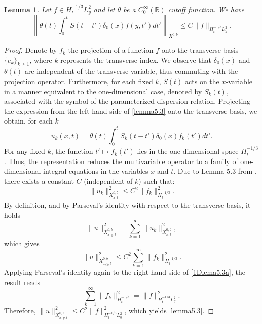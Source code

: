 \documentclass[11pt]{article}
\numberwithin{equation}{section}
\newtheorem{lemma}{Lemma}
\begin{document}
\begin{lemma}\label{lema5.3}
Let $f\in H^{-1/3}_{t}L^{2}_{y}$ and let $\theta$ be a $C_{0}^{\infty}(\mathbb{R})$ cutoff function. We have \begin{equation}\label{lemma5.3}
\left\|\theta(t)\int_{0}^{t} S(t-t')\delta_{0}(x)f(y,t')dt'\right\|_{X^{0,b}}\leq C\|f\|_{H^{-1/3}_{t}L^{2}_{y}}.\end{equation}
\end{lemma}
\begin{proof}
Denote by $f_{k}$ the projection of a function $f$ onto the transverse basis $\{e_{k}\}_{k \ge 1}$, where $k$ represents the transverse index. We observe that $\delta_{0}(x)$ and $\theta(t)$ are independent of the transverse variable, thus commuting with the projection operator. Furthermore, for each fixed $k$, $S(t)$ acts on the $x$-variable in a manner equivalent to the one-dimensional case, denoted by $S_{k}(t)$, associated with the symbol of the parameterized dispersion relation. Projecting the expression from the left-hand side of \eqref{lemma5.3} onto the transverse basis, we obtain, for each $k$
\begin{equation}
u_{k}(x,t) = \theta(t)\int_{0}^{t} S_{k}(t-t')\delta_{0}(x)f_{k}(t')dt'.\end{equation}
For any fixed $k$, the function $t' \mapsto f_{k}(t')$ lies in the one-dimensional space $H^{-1/3}_{t}$. Thus, the representation reduces the multivariable operator to a family of one-dimensional integral equations in the variables $x$ and $t$. Due to Lemma 5.3 from \cite{CK}, there exists a constant $C$ (independent of $k$) such that:
\begin{equation}\label{1Dlema5.3}
\|u_{k}\|_{X^{0,b}_{x,t}}^{2} \leq C^{2} \|f_{k}\|_{H^{-1/3}_{t}}^{2}.\end{equation}
By definition, and by Parseval's identity with respect to the transverse basis, it holds
\begin{equation}
\|u\|_{X^{0,b}_{x,y,t}}^{2} = \sum_{k=1}^{\infty} \|u_{k}\|_{X^{0,b}_{x,t}}^{2},\end{equation}
which gives
\begin{equation}\label{1Dlema5.3a}
\|u\|_{X^{0,b}_{x,y,t}}^{2} \leq C^{2} \sum_{k=1}^{\infty} \|f_{k}\|_{H^{-1/3}_{t}}^{2}.\end{equation}
Applying Parseval's identity again to the right-hand side of \eqref{1Dlema5.3a}, the result reads
\begin{equation}\sum_{k=1}^{\infty} \|f_{k}\|_{H^{-1/3}_{t}}^{2} = \|f\|_{H^{-1/3}_{t}L^{2}_{y}}^{2}.\end{equation}
Therefore, $\|u\|_{X^{0,b}_{x,y,t}}^{2} \leq C^{2} \|f\|_{H^{-1/3}_{t}L^{2}_{y}}^{2}$, which yields \eqref{lemma5.3}.
\end{proof}
\end{document}
